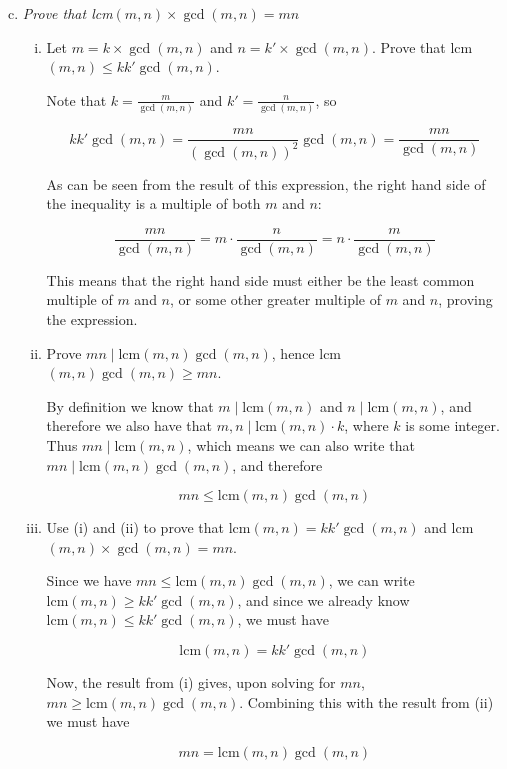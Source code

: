 \documentclass{article}
\begin{document}
\begin{enumerate}[(a)]\setcounter{enumi}{2}
  \item \textit{Prove that lcm$(m,n) \times \gcd(m,n) = mn$}
    \begin{enumerate}[(i)]
      \item Let $m = k \times \gcd(m,n)$ and $n = k'\times\gcd(m,n)$. Prove that lcm$(m,n) \leq kk'\gcd(m,n)$.
        
        Note that $k = \frac{m}{\gcd(m,n)}$ and $k' = \frac{n}{\gcd(m,n)}$, so

        $$kk'\gcd(m,n) = \frac{mn}{(\gcd(m,n))^2}\gcd(m,n) = \frac{mn}{\gcd(m,n)}$$

        As can be seen from the result of this expression, the right hand side of the inequality is a multiple of both $m$ and $n$:

        $$\frac{mn}{\gcd(m,n)} = m\cdot\frac{n}{\gcd(m,n)} = n\cdot\frac{m}{\gcd(m,n)}$$

        This means that the right hand side must either be the least common multiple of $m$ and $n$, or some other greater multiple of $m$ and $n$, proving the expression.
      \item Prove $mn \mid \text{lcm}(m,n)\gcd(m,n)$, hence lcm$(m,n)\gcd(m,n) \geq mn$.

        By definition we know that $m \mid \text{lcm}(m,n)$ and $n \mid \text{lcm}(m,n)$, and therefore we also have that $m,n \mid \text{lcm}(m,n) \cdot k$, where $k$ is some integer. Thus $mn \mid \text{lcm}(m,n)$, which means we can also write that $mn \mid \text{lcm}(m,n)\gcd(m,n)$, and therefore

        $$mn \leq \text{lcm}(m,n)\gcd(m,n)$$
      \item Use (i) and (ii) to prove that lcm$(m,n) = kk'\gcd(m,n)$ and lcm$(m,n) \times \gcd(m,n) = mn$.

        Since we have $mn \leq \text{lcm}(m,n)\gcd(m,n)$, we can write $\text{lcm}(m,n) \geq kk'\gcd(m,n)$, and since we already know $\text{lcm}(m,n) \leq kk'\gcd(m,n)$, we must have 

        $$\text{lcm}(m,n) = kk' \gcd(m,n)$$

        Now, the result from (i) gives, upon solving for $mn$, $mn \geq \text{lcm}(m,n) \gcd(m,n)$. Combining this with the result from (ii) we must have

        $$mn = \text{lcm}(m,n)\gcd(m,n)$$
    \end{enumerate}
\end{enumerate}
\end{document}
